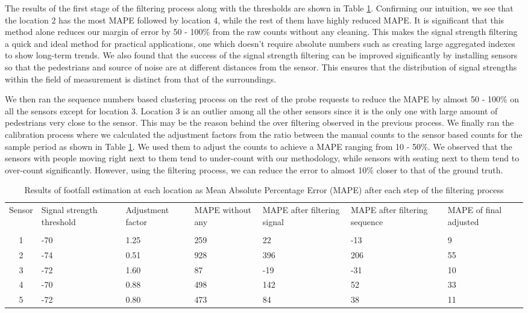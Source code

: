 The results of the first stage of the filtering process along with the
thresholds are shown in Table \ref{errors_table}.  Confirming our intuition, we
see that the location 2 has the most MAPE followed by location 4, while the rest
of them have highly reduced MAPE.  It is significant that this method alone
reduces our margin of error by 50 - 100\% from the raw counts without any
cleaning.  This makes the signal strength filtering a quick and ideal method for
practical applications, one which doesn't require absolute numbers such as
creating large aggregated indexes to show long-term trends.  We also found that
the success of the signal strength filtering can be improved significantly by
installing sensors so that the pedestrians and source of noise are at different
distances from the sensor. This ensures that the distribution of signal
strengths within the field of measurement is distinct from that of the
surroundings.

We then ran the sequence numbers based clustering process on the rest of the
probe requests to reduce the MAPE by almost 50 - 100\% on all the sensors except
for location 3.  Location 3 is an outlier among all the other sensors since it
is the only one with large amount of pedestrians very close to the sensor.  This
may be the reason behind the over filtering observed in the previous process.
We finally ran the calibration process where we calculated the adjustment
factors from the ratio between the manual counts to the sensor based counts for
the sample period as shown in Table \ref{errors_table}.  We used them to adjust
the counts to achieve a MAPE ranging from 10 - 50\%. We observed that the
sensors with people moving right next to them tend to under-count with our
methodology, while sensors with seating next to them tend to over-count
significantly. However, using the filtering process, we can reduce the error to
almost 10\% closer to that of the ground truth.

\begin{table}
  \footnotesize
	\caption{Results of footfall estimation at each location as Mean Absolute Percentage Error (MAPE) after each step of the filtering process}
  {\begin{tabular}{cp{1.4cm}p{1.4cm}p{1.4cm}p{1.4cm}p{1.4cm}p{1.4cm}} 
		\toprule
			Sensor & Signal strength threshold& Adjustment factor& MAPE without any & MAPE after filtering signal& MAPE after filtering sequence & MAPE of final adjusted\\
			&  &  & &  &  & \\
		 \midrule
			1 & -70 & 1.25 & 259 &  22 & -13 &  9 \\
			2 & -74 & 0.51 & 928 & 396 & 206 & 55 \\
			3 & -72 & 1.60 &  87 & -19 & -31 & 10 \\
			4 & -70 & 0.88 & 498 & 142 &  52 & 33 \\
			5 & -72 & 0.80 & 473 &  84 &  38 & 11 \\
		 \bottomrule
	\end{tabular}}
	\label{errors_table}
\end{table}

